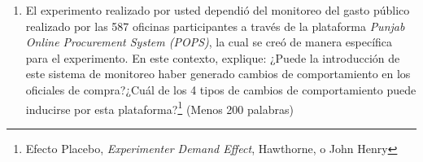 \documentclass[a4paper, answers, addpoints, 11pt]{exam}
\begin{document}
\begin{enumerate}
   

    \item El experimento realizado por usted dependió del monitoreo del gasto público realizado por las 587 oficinas participantes a través de la plataforma \textit{Punjab Online Procurement System (POPS)}, la cual se creó de manera específica para el experimento. En este contexto, explique: ¿Puede la introducción de este sistema de monitoreo haber generado cambios de comportamiento en los oficiales de compra?¿Cuál de los 4 tipos de cambios de comportamiento puede inducirse por esta plataforma?\footnote{\footnotesize{Efecto Placebo, \textit{Experimenter Demand Effect}, Hawthorne, o John Henry}} (Menos 200 palabras)
\end{enumerate}
\end{document}
